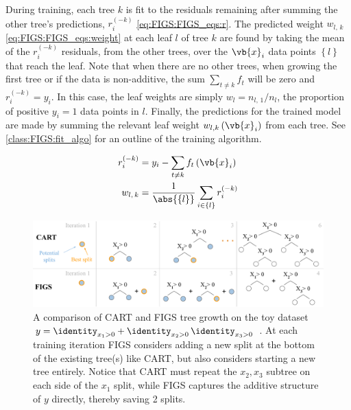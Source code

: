 During training, each tree $k$ is fit to the residuals remaining after summing the other tree's predictions,
$r_{i}^{\left(-k\right)}$ \cref{eq:FIGS:FIGS_eqs:r}.
The predicted weight $w_{l,\,k}$ \cref{eq:FIGS:FIGS_eqs:weight} at each leaf $l$ of tree $k$
are found by taking the mean of the $r_{i}^{\left(-k\right)}$ residuals, from the other trees,
over the $\vb{x}_{i}$ data points $\left\{l\right\}$ that reach the leaf.
Note that when there are no other trees,
\eg when growing the first tree or if the data is non-additive,
the sum $\sum_{t \neq k} f_{t}$ will be zero and $r_{i}^{\left(-k\right)} = y_{i}$.
In this case, the leaf weights are simply $w_{l} = n_{l,\,1}/n_{l}$,
\ie the proportion of positive $y_{i} = 1$ data points in $l$.
Finally, the predictions for the trained model are made by
summing the relevant leaf weight $w_{l,k}\left(\vb{x}_{i}\right)$ from each tree.
See \cref{class:FIGS:fit_algo} for an outline of the training algorithm.

\begin{subequations}\label{eq:FIGS_eqs}
\begin{align}
r_{i}^{\left(-k\right)} &= y_{i} - \sum_{t \neq k} f_{t}\left(\vb{x}_{i}\right) \label{eq:FIGS:FIGS_eqs:r} \\
w_{l,\,k} &= \frac{1}{\abs{\left\{l\right\}}} \sum_{i \in \left\{l\right\}} r_{i}^{\left(-k\right)} \label{eq:FIGS:FIGS_eqs:weight}
\end{align}
\end{subequations}

\begin{figure}[H]
\centering
\includegraphics[width=\textwidth]{figures/ml/figs_intro_fig}
\caption{
A comparison of CART and FIGS tree growth on the toy dataset
$y = \identity_{x_{1} > 0} + \identity_{x_{2} > 0} \, \identity_{x_{3} > 0}$ \cite{FIGS}.
At each training iteration FIGS considers adding a new split at the bottom of the existing tree(s) like CART,
but also considers starting a new tree entirely.
Notice that CART must repeat the $x_{2}, x_{3}$ subtree on each side of the $x_{1}$ split,
while FIGS captures the additive structure of $y$ directly, thereby saving \num{2} splits.
}
\label{class:FIGS:intro}
\end{figure}

